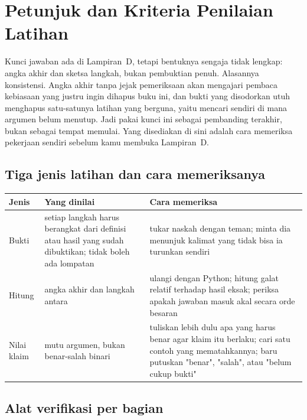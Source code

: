 \chapter{Petunjuk dan Kriteria Penilaian Latihan}
\label{app:petunjuk}

Kunci jawaban ada di Lampiran~D, tetapi bentuknya sengaja tidak lengkap: angka akhir
dan sketsa langkah, bukan pembuktian penuh. Alasannya konsistensi. Angka akhir tanpa
jejak pemeriksaan akan mengajari pembaca kebiasaan yang justru ingin dihapus buku ini,
dan bukti yang disodorkan utuh menghapus satu-satunya latihan yang berguna, yaitu
mencari sendiri di mana argumen belum menutup. Jadi pakai kunci ini sebagai pembanding
terakhir, bukan sebagai tempat memulai. Yang disediakan di sini adalah cara memeriksa
pekerjaan sendiri sebelum kamu membuka Lampiran~D.

\section*{Tiga jenis latihan dan cara memeriksanya}

\begin{center}
\small
\begin{tabular}{@{}p{2.6cm}p{5.6cm}p{5.8cm}@{}}
\toprule
\textbf{Jenis} & \textbf{Yang dinilai} & \textbf{Cara memeriksa} \\
\midrule
Bukti & setiap langkah harus berangkat dari definisi atau hasil yang sudah
  dibuktikan; tidak boleh ada lompatan & tukar naskah dengan teman; minta dia
  menunjuk kalimat yang tidak bisa ia turunkan sendiri \\
Hitung & angka akhir dan langkah antara & ulangi dengan Python; hitung galat
  relatif terhadap hasil eksak; periksa apakah jawaban masuk akal secara
  orde besaran \\
Nilai klaim & mutu argumen, bukan benar-salah binari & tuliskan lebih dulu apa
  yang harus benar agar klaim itu berlaku; cari satu contoh yang mematahkannya;
  baru putuskan "benar", "salah", atau "belum cukup bukti" \\
\bottomrule
\end{tabular}
\end{center}

\section*{Alat verifikasi per bagian}

